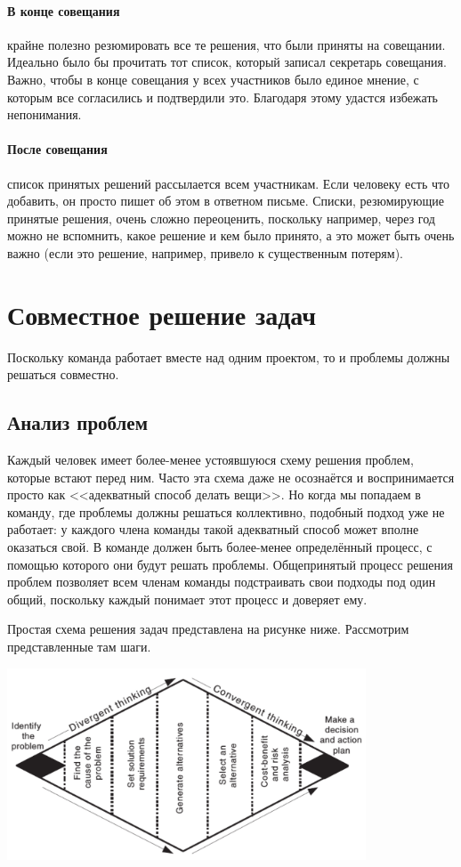 \documentclass{../../text-style}
\begin{document}
\paragraph*{В конце совещания} крайне полезно резюмировать все те решения, что были приняты на совещании. Идеально было бы прочитать тот список, который записал секретарь совещания. Важно, чтобы в конце совещания у всех участников было единое мнение, с которым все согласились и подтвердили это. Благодаря этому удастся избежать непонимания.

\paragraph*{После совещания} список принятых решений рассылается всем участникам. Если человеку есть что добавить, он просто пишет об этом в ответном письме. Списки, резюмирующие принятые решения, очень сложно переоценить, поскольку например, через год можно не вспомнить, какое решение и кем было принято, а это может быть очень важно (если это решение, например, привело к существенным потерям).

\section{Совместное решение задач}

Поскольку команда работает вместе над одним проектом, то и проблемы должны решаться совместно.

\subsection{Анализ проблем}

Каждый человек имеет более-менее устоявшуюся схему решения проблем, которые встают перед ним. Часто эта схема даже не осознаётся и воспринимается просто как <<адекватный способ делать вещи>>. Но когда мы попадаем в команду, где проблемы должны решаться коллективно, подобный подход уже не работает: у каждого члена команды такой адекватный способ может вполне оказаться свой. В команде должен быть более-менее определённый процесс, с помощью которого они будут решать проблемы. Общепринятый процесс решения проблем позволяет всем членам команды подстраивать свои подходы под один общий, поскольку каждый понимает этот процесс и доверяет ему.

Простая схема решения задач представлена на рисунке ниже. Рассмотрим представленные там шаги.

\begin{center}
    \includegraphics[width=0.8\textwidth]{taskAnalysis.png}
\end{center}
\end{document}
